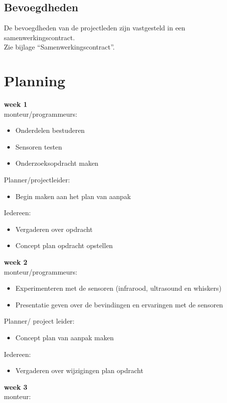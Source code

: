 \documentclass[oneside]{book}
\begin{document}
\section*{Bevoegdheden}
De bevoegdheden van de projectleden zijn vastgesteld in een samenwerkingscontract.\\
Zie bijlage “Samenwerkingscontract”.
\clearpage
\chapter{Planning}
{\large \textbf{week 1}}\\
monteur/programmeurs:\\
\begin{itemize}
\item Onderdelen bestuderen
\item Sensoren testen
\item Onderzoeksopdracht maken
\end{itemize}
Planner/projectleider:\\
\begin{itemize}
\item Begin maken aan het plan van aanpak
\end{itemize}
Iedereen:\\
\begin{itemize}
\item Vergaderen over opdracht
\item Concept plan opdracht opstellen
\end{itemize}
{\large \textbf{week 2}}\\
monteur/programmeurs:\\
\begin{itemize}
\item Experimenteren met de sensoren (infrarood, ultrasound en whiskers)
\item Presentatie geven over de bevindingen en ervaringen met de sensoren
\end{itemize}
Planner/ project leider:\\
\begin{itemize}
\item Concept plan van aanpak maken	
\end{itemize}
Iedereen:\\
\begin{itemize}
\item Vergaderen over wijzigingen plan opdracht
\end{itemize}
\clearpage
{\large \textbf{week 3}}\\
monteur: \\
\end{document}
